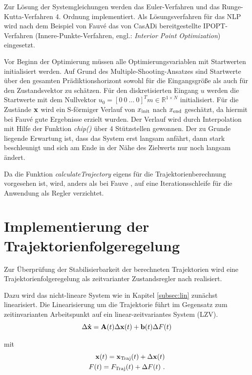 Zur Lösung der Systemgleichungen werden das Euler-Verfahren und das Runge-Kutta-Verfahren 4. Ordnung implementiert. Als Lösungsverfahren für das NLP wird nach dem Beispiel von Fauvé \cite{fauve} das von CasADi bereitgestellte IPOPT-Verfahren (Innere-Punkte-Verfahren, engl.: \textit{Interior Point Optimization}) eingesetzt.

Vor Beginn der Optimierung müssen alle Optimierungsvariablen mit Startwerten initialisiert werden. Auf Grund des Multiple-Shooting-Ansatzes sind Startwerte über den gesamten Prädiktionshorizont sowohl für die Eingangsgröße als auch für den Zustandsvektor zu schätzen. Für den diskretisierten Eingang $u$ werden die Startwerte mit dem Nullvektor $u_0 = [0 \ 0 \ \ldots \ 0 ]^Tm\in \mathbb{R}^{1 \times N}$ initialisiert. Für die Zustände $\boldsymbol{\mathrm{x}}$ wird ein S-förmiger Verlauf von $x_{\mathrm{init}}$ nach $x_{\mathrm{end}}$ geschätzt, da hiermit bei Fauvé \cite{fauve} gute Ergebnisse erzielt wurden. Der Verlauf wird durch Interpolation mit Hilfe der Funktion \textit{chip()} über 4  Stützstellen gewonnen. Der zu Grunde liegende Erwartung ist, dass das System erst langsam anfährt, dann stark beschleunigt und sich am Ende in der Nähe des Zielwerts nur noch langsam ändert.

Da die Funktion \textit{calculateTrajectory} eigens für die Trajektorienberechnung vorgesehen ist, wird, anders als bei Fauve \cite{fauve}, auf eine Iterationsschleife für die Anwendung als Regler verzichtet.

\section{Implementierung der Trajektorienfolgeregelung}

Zur Überprüfung der Stabilisierbarkeit der berechneten Trajektorien wird eine Trajektorienfolgeregelung als zeitvarianter Zustandsregler nach \cite{matPrakt2} realisiert. 

Dazu wird das nicht-lineare System wie in Kapitel \ref{subsec:lin} zunächst linearisiert. Die Linearisierung um die Trajektorie führt im Gegensatz zum zeitinvarianten Arbeitspunkt auf ein linear-zeitvariantes System (LZV).
	\[
	\Delta \boldsymbol{\mathrm{\dot{x}}} = {\boldsymbol{\mathrm{A}}}(t) \Delta \boldsymbol{\mathrm{x}}(t) + \boldsymbol{\mathrm{b}}(t) \Delta F(t)
\]

mit 
\begin{align*}
	\boldsymbol{\mathrm{x}}(t) = \boldsymbol{\mathrm{x}}_{\mathrm{Traj}}(t) + \Delta \boldsymbol{\mathrm{x}}(t) \\
	 F(t) = F_{\mathrm{Traj}}(t) + \Delta F(t) \ .
\end{align*}

